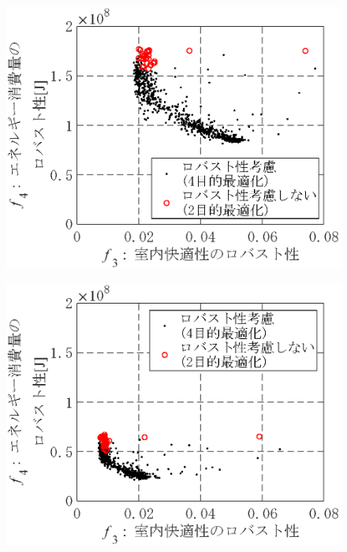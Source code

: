 \begin{figure}[htbp]
\begin{center}
\begin{minipage}{0.3\textwidth}
\begin{center}
            \end{center}
        \end{minipage}
        \begin{minipage}{0.3\textwidth}
            \begin{center}
                \includegraphics[width=1\textwidth,keepaspectratio=true]{fig/robust_result_pareto_f3f4_10_7.eps}\\\vspace{-3mm}{\small (g)下方誤差があった場合2}
            \end{center}
        \end{minipage}
        \begin{minipage}{0.3\textwidth}
            \begin{center}
                \includegraphics[width=1\textwidth,keepaspectratio=true]{fig/robust_result_pareto_f3f4_10_8.eps}\\\vspace{-3mm}{\small (h)下方誤差があった場合3}

\end{center}
\end{minipage}
\end{center}
\end{figure}
